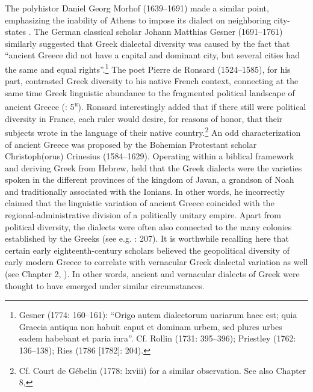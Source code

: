 The polyhistor Daniel Georg Morhof (1639–1691) made a similar point, emphasizing the inability of Athens to impose its dialect on neighboring city-states \citep[146]{Morhof1685}. The German classical scholar Johann Matthias Gesner (1691–1761) similarly suggested that Greek dialectal diversity was caused by the fact that “ancient Greece did not have a capital and dominant city, but several cities had the same and equal rights”.\footnote{Gesner (1774: 160–161): “Origo autem dialectorum uariarum haec est; quia Graecia antiqua non habuit caput et dominam urbem, sed plures urbes eadem habebant et paria iura”. Cf. Rollin (1731: 395–396); Priestley (1762: 136–138); Ries (1786 [1782]: 204).} The poet Pierre de Ronsard (1524–1585), for his part, contrasted Greek diversity to his native French context, connecting at the same time Greek linguistic abundance to the fragmented political landscape of ancient Greece (\citealt{Ronsard1565}: 5\textsc{\textsuperscript{r}}). Ronsard interestingly added that if there still were political diversity in France, each ruler would desire, for reasons of honor, that their subjects wrote in the language of their native country.\footnote{Cf. Court de Gébelin (1778: lxviii) for a similar observation. See also Chapter 8, } An odd characterization of ancient Greece was proposed by the Bohemian Protestant scholar Christoph(orus) Crinesius (1584–1629). Operating within a biblical framework and deriving Greek from Hebrew, \citet[77]{Crinesius1629} held that the Greek dialects were the varieties spoken in the different provinces of the kingdom of Javan, a grandson of Noah and traditionally associated with the Ionians. In other words, he incorrectly claimed that the linguistic variation of ancient Greece coincided with the regional-administrative division of a politically unitary empire. Apart from political diversity, the dialects were often also connected to the many colonies established by the Greeks (see e.g. \citealt{Simonis1752}: 207). It is worthwhile recalling here that certain early eighteenth-century scholars believed the geopolitical diversity of early modern Greece to correlate with vernacular Greek dialectal variation as well (see Chapter 2, ). In other words, ancient and vernacular dialects of Greek were thought to have emerged under similar circumstances.

